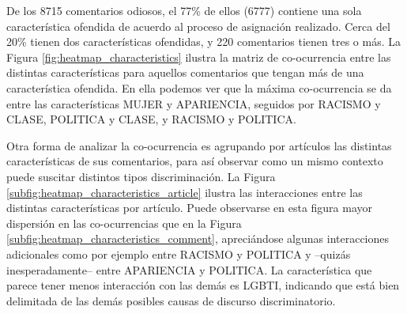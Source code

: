 De los \num{8715} comentarios odiosos, el 77\% de ellos (\num{6777}) contiene una sola característica ofendida de acuerdo al proceso de asignación realizado. Cerca del 20\% tienen dos características ofendidas, y 220 comentarios tienen tres o más. La Figura \ref{fig:heatmap_characteristics} ilustra la matriz de co-ocurrencia entre las distintas características para aquellos comentarios que tengan más de una característica ofendida. En ella podemos ver que la máxima co-ocurrencia se da entre las características MUJER y APARIENCIA, seguidos por RACISMO y CLASE, POLITICA y CLASE, y RACISMO y POLITICA.



Otra forma de analizar la co-ocurrencia es agrupando por artículos las distintas características de sus comentarios, para así observar como un mismo contexto puede suscitar distintos tipos discriminación. La Figura \ref{subfig:heatmap_characteristics_article} ilustra las interacciones entre las distintas características por artículo. Puede observarse en esta figura mayor dispersión en las co-ocurrencias que en la Figura \ref{subfig:heatmap_characteristics_comment}, apreciándose algunas interacciones adicionales como por ejemplo entre RACISMO y POLITICA y --quizás inesperadamente-- entre APARIENCIA y POLITICA. La característica que parece tener menos interacción con las demás es LGBTI, indicando que está bien delimitada de las demás posibles causas de discurso discriminatorio.

